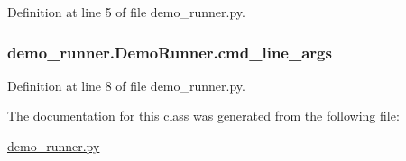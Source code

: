 Definition at line 5 of file demo\+\_\+runner.\+py.

\hypertarget{classdemo__runner_1_1_demo_runner_af8316834678869878cfe909526261c32}{}
\subsubsection[{cmd\+\_\+line\+\_\+args}]{\setlength{\rightskip}{0pt plus 5cm}demo\+\_\+runner.\+Demo\+Runner.\+cmd\+\_\+line\+\_\+args}\label{classdemo__runner_1_1_demo_runner_af8316834678869878cfe909526261c32}


Definition at line 8 of file demo\+\_\+runner.\+py.



The documentation for this class was generated from the following file\+:\begin{DoxyCompactItemize}
\item 
\hyperlink{demo__runner_8py}{demo\+\_\+runner.\+py}\end{DoxyCompactItemize}
